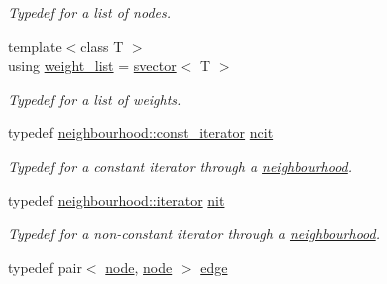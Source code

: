 \begin{DoxyCompactItemize}
\begin{DoxyCompactList}\small\item\em Typedef for a list of nodes. \end{DoxyCompactList}\item 
{\footnotesize template$<$class T $>$ }\\using \hyperlink{namespacelgraph_1_1utils_a11e7963f3637ea13778b8d3e69d2c17f}{weight\+\_\+list} = \hyperlink{classlgraph_1_1utils_1_1svector}{svector}$<$ T $>$\hypertarget{namespacelgraph_1_1utils_a11e7963f3637ea13778b8d3e69d2c17f}{}\label{namespacelgraph_1_1utils_a11e7963f3637ea13778b8d3e69d2c17f}

\begin{DoxyCompactList}\small\item\em Typedef for a list of weights. \end{DoxyCompactList}\item 
typedef \hyperlink{classlgraph_1_1utils_1_1svector_a50774ce617a742e76f3fb8cc0a7a9445}{neighbourhood\+::const\+\_\+iterator} \hyperlink{namespacelgraph_1_1utils_a7207b078932845778282f5e2e373575b}{ncit}\hypertarget{namespacelgraph_1_1utils_a7207b078932845778282f5e2e373575b}{}\label{namespacelgraph_1_1utils_a7207b078932845778282f5e2e373575b}

\begin{DoxyCompactList}\small\item\em Typedef for a constant iterator through a \hyperlink{namespacelgraph_1_1utils_a0f2ef47028a466d26841709e705390ac}{neighbourhood}. \end{DoxyCompactList}\item 
typedef \hyperlink{classlgraph_1_1utils_1_1svector_a518288794e754e27d2e2274ced4485a6}{neighbourhood\+::iterator} \hyperlink{namespacelgraph_1_1utils_af5daf6fe356a9014746bdb507787ae01}{nit}\hypertarget{namespacelgraph_1_1utils_af5daf6fe356a9014746bdb507787ae01}{}\label{namespacelgraph_1_1utils_af5daf6fe356a9014746bdb507787ae01}

\begin{DoxyCompactList}\small\item\em Typedef for a non-\/constant iterator through a \hyperlink{namespacelgraph_1_1utils_a0f2ef47028a466d26841709e705390ac}{neighbourhood}. \end{DoxyCompactList}\item 
typedef pair$<$ \hyperlink{namespacelgraph_1_1utils_a7bd66ede3805ef121bc2835bd48de0cf}{node}, \hyperlink{namespacelgraph_1_1utils_a7bd66ede3805ef121bc2835bd48de0cf}{node} $>$ \hyperlink{namespacelgraph_1_1utils_a6510284ce1b1ae5dc97ce5d2de426e10}{edge}\hypertarget{namespacelgraph_1_1utils_a6510284ce1b1ae5dc97ce5d2de426e10}{}\label{namespacelgraph_1_1utils_a6510284ce1b1ae5dc97ce5d2de426e10}


\end{DoxyCompactItemize}
